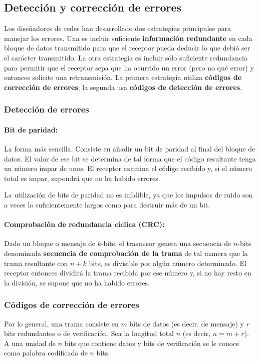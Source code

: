 \subsection{Detección y corrección de errores}

Los diseñadores de redes han desarrollado dos estrategias principales para manejar los errores. Una es incluir suficiente \textbf{información redundante} en cada bloque de datos transmitido para que el receptor pueda deducir lo que debió ser el carácter transmitido. La otra estrategia es incluir sólo suficiente redundancia para permitir que el receptor sepa que ha ocurrido un error (pero no qué error) y entonces solicite una retransmisión. La primera estrategia utiliza \textbf{códigos de corrección de errores}; la segunda usa \textbf{códigos de detección de errores}. 

\subsubsection{Detección de errores}
\paragraph{Bit de paridad:} La forma más sencilla. Consiste en añadir un bit de paridad al final del bloque de datos. El valor de ese bit se determina de tal forma que el código resultante tenga un número impar de unos. El receptor examina el código recibido y, si el número total es impar, supondrá que no ha habido errores. 

La utilización de bits de paridad no es infalible, ya que los impulsos de ruido son a veces lo suficientemente largos como para destruir más de un bit.

\paragraph{Comprobación de redundancia cíclica (CRC):} Dado un bloque o mensaje de \(k\)-bits, el trasmisor genera una secuencia de \(n\)-bits denominada \textbf{secuencia de comprobación de la trama} de tal manera que la trama resultante con \(n+k\) bits, es divisible por algún número determinado. El receptor entonces dividirá la trama recibida por ese número y, si no hay resto en la división, se supone que no ha habido errores.

\subsubsection{Códigos de corrección de errores}
Por lo general, una trama consiste en \(m\) bits de datos (es decir, de mensaje) y \(r\) bits redundantes o de verificación. Sea la longitud total \(n\) (es decir, \(n = m + r\)). A una unidad de \(n\) bits que contiene datos y bits de verificación se le conoce como palabra codificada de \(n\) bits.

